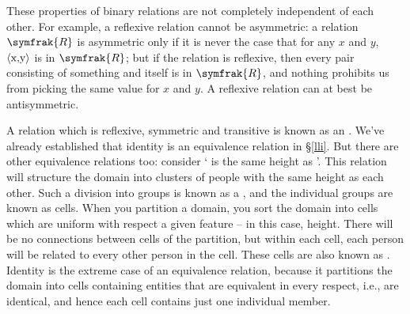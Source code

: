 These properties of binary relations are not completely independent of each other. For example, a reflexive relation cannot be asymmetric: a relation $\symfrak{R}$ is asymmetric only if it is never the case that for any $x$ and $y$, $\mbox{\ensuremath{\mathopen{\langle}}x,y\ensuremath{\mathclose{\rangle}}}$ is in $\symfrak{R}$; but if the relation is reflexive, then every pair consisting of something and itself is in $\symfrak{R}$, and nothing prohibits us from picking the same value for $x$ and $y$. A reflexive relation can at best be antisymmetric. 


A relation which is reflexive, symmetric and transitive is known as an . We've already established that identity is an equivalence relation in §\ref{lli}. But there are other equivalence relations too: consider ` is the same height as '. This relation will structure the domain into clusters of people with the same height as each other. Such a division into groups is known as a , and the individual groups are known as cells. When you partition a domain, you sort the domain into cells which are uniform with respect a given feature – in this case, height. There will be no connections between cells of the partition, but within each cell, each person will be related to every other person in the cell. These cells are also known as . Identity is the extreme case of an equivalence relation, because it partitions the domain into cells containing entities that are equivalent in every respect, i.e., are identical, and hence each cell contains just one individual member.

